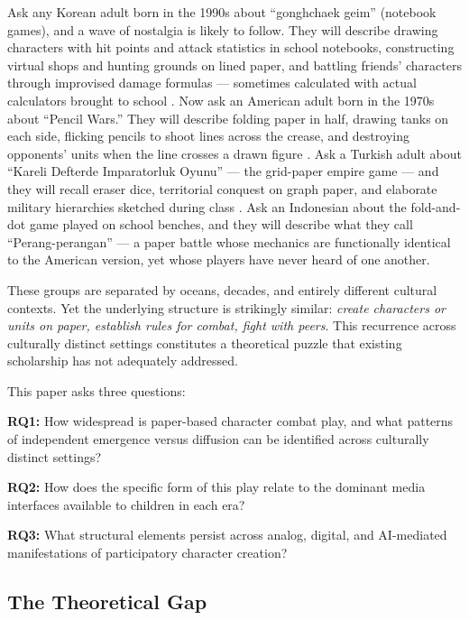 \documentclass[12pt]{article}
\begin{document}
Ask any Korean adult born in the 1990s about ``gonghchaek geim'' (notebook games), and a wave of nostalgia is likely to follow. They will describe drawing characters with hit points and attack statistics in school notebooks, constructing virtual shops and hunting grounds on lined paper, and battling friends' characters through improvised damage formulas --- sometimes calculated with actual calculators brought to school \citep{namuwiki}. Now ask an American adult born in the 1970s about ``Pencil Wars.'' They will describe folding paper in half, drawing tanks on each side, flicking pencils to shoot lines across the crease, and destroying opponents' units when the line crosses a drawn figure \citep{straightdope2016}. Ask a Turkish adult about ``Kareli Defterde Imparatorluk Oyunu'' --- the grid-paper empire game --- and they will recall eraser dice, territorial conquest on graph paper, and elaborate military hierarchies sketched during class \citep{eksisozluk}. Ask an Indonesian about the fold-and-dot game played on school benches, and they will describe what they call ``Perang-perangan'' --- a paper battle whose mechanics are functionally identical to the American version, yet whose players have never heard of one another.

These groups are separated by oceans, decades, and entirely different cultural contexts. Yet the underlying structure is strikingly similar: \emph{create characters or units on paper, establish rules for combat, fight with peers}. This recurrence across culturally distinct settings constitutes a theoretical puzzle that existing scholarship has not adequately addressed.

This paper asks three questions:

\medskip
\noindent\textbf{RQ1:} How widespread is paper-based character combat play, and what patterns of independent emergence versus diffusion can be identified across culturally distinct settings?

\medskip
\noindent\textbf{RQ2:} How does the specific form of this play relate to the dominant media interfaces available to children in each era?

\medskip
\noindent\textbf{RQ3:} What structural elements persist across analog, digital, and AI-mediated manifestations of participatory character creation?

\subsection{The Theoretical Gap}
\end{document}
